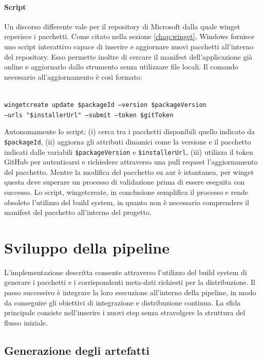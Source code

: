 \paragraph{Script} Un discorso differente vale per il repository di Microsoft dalla quale winget reperisce i pacchetti. Come citato nella sezione \ref{chap:winget}, Windows fornisce uno script interattivo capace di inserire e aggiornare nuovi pacchetti all'interno del repository. Esso permette inoltre di cercare il manifest dell'applicazione già online e aggiornarlo dallo strumento senza utilizzare file locali. Il comando necessario all'aggiornamento è così formato:

\texttt{\\wingetcreate update \$packageId --version \$packageVersion \\\tab\tab --urls "\$installerUrl" --submit --token \$gitToken}
\vspace{0.8cm}

Autonomamente lo script: (i) cerca tra i pacchetti disponibili quello indicato da \texttt{\$packageId}, (ii) aggiorna gli attributi dinamici come la versione e il pacchetto indicati dalle variabili \texttt{\$packageVersion} e \texttt{\$installerUrl}, (iii) utilizza il token GitHub per autenticarsi e richiedere attraverso una pull request l'aggiornamento del pacchetto. Mentre la modifica del pacchetto su \ac{aur} è istantanea, per winget questa deve superare un processo di validazione prima di essere eseguita con successo. Lo script, wingetcreate, in conclusione semplifica il processo e rende obsoleto l'utilizzo del build system, in quanto non è necessario comprendere il manifest del pacchetto all'interno del progetto.

\section{Sviluppo della pipeline}

L'implementazione descritta consente attraverso l'utilizzo del build system di generare i pacchetti e i corrispondenti meta-dati richiesti per la distribuzione. Il passo successivo è integrare la loro esecuzione all'interno della pipeline, in modo da conseguire gli obiettivi di integrazione e distribuzione continua. La sfida principale consiste nell'inserire i nuovi step senza stravolgere la struttura del flusso iniziale.

\subsection{Generazione degli artefatti}

